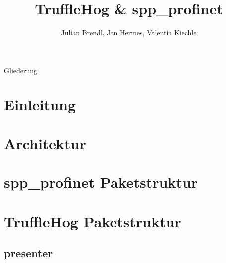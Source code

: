 \documentclass[18pt]{beamer}
\title[TruffleHog \& spp\_profinet]{TruffleHog \& spp\_profinet}
\author{Julian Brendl, Jan Hermes, Valentin Kiechle}
\institute{Fraunhofer IOSB}
\begin{document}

\begin{frame}
	\titlepage
\end{frame}

\begin{frame}{Gliederung}
	\tableofcontents
\end{frame}

\section{Einleitung}
	

\section{Architektur}
	
	
	
	
	
	
	
	
	
	
	
	
	
	
	
	
	
	
	
	

\section{spp\_profinet Paketstruktur}
	
	
	
	
	
	
	

\section{TruffleHog Paketstruktur}
	
	\subsection{presenter}
		
\end{document}
